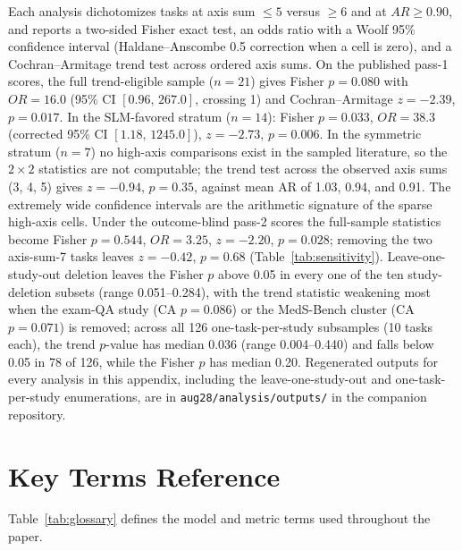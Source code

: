 \documentclass[11pt]{article}
\begin{document}
Each analysis dichotomizes tasks at axis sum $\leq 5$ versus $\geq 6$ and at $AR \geq 0.90$, and reports a two-sided Fisher exact test, an odds ratio with a Woolf 95\% confidence interval (Haldane--Anscombe 0.5 correction when a cell is zero), and a Cochran--Armitage trend test across ordered axis sums. On the published pass-1 scores, the full trend-eligible sample ($n = 21$) gives Fisher $p = 0.080$ with $OR = 16.0$ (95\% CI $[0.96,\,267.0]$, crossing 1) and Cochran--Armitage $z = -2.39$, $p = 0.017$. In the SLM-favored stratum ($n = 14$): Fisher $p = 0.033$, $OR = 38.3$ (corrected 95\% CI $[1.18,\,1245.0]$), $z = -2.73$, $p = 0.006$. In the symmetric stratum ($n = 7$) no high-axis comparisons exist in the sampled literature, so the $2{\times}2$ statistics are not computable; the trend test across the observed axis sums (3, 4, 5) gives $z = -0.94$, $p = 0.35$, against mean AR of 1.03, 0.94, and 0.91. The extremely wide confidence intervals are the arithmetic signature of the sparse high-axis cells. Under the outcome-blind pass-2 scores the full-sample statistics become Fisher $p = 0.544$, $OR = 3.25$, $z = -2.20$, $p = 0.028$; removing the two axis-sum-7 tasks leaves $z = -0.42$, $p = 0.68$ (Table~\ref{tab:sensitivity}). Leave-one-study-out deletion leaves the Fisher $p$ above 0.05 in every one of the ten study-deletion subsets (range 0.051--0.284), with the trend statistic weakening most when the exam-QA study (CA $p = 0.086$) or the MedS-Bench cluster (CA $p = 0.071$) is removed; across all 126 one-task-per-study subsamples (10 tasks each), the trend $p$-value has median 0.036 (range 0.004--0.440) and falls below 0.05 in 78 of 126, while the Fisher $p$ has median 0.20. Regenerated outputs for every analysis in this appendix, including the leave-one-study-out and one-task-per-study enumerations, are in \texttt{aug28/analysis/outputs/} in the companion repository.

\section{Key Terms Reference}
\label{app:glossary}

Table~\ref{tab:glossary} defines the model and metric terms used throughout the paper.
\end{document}
